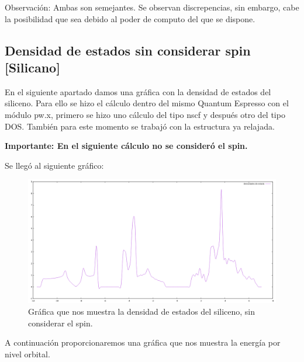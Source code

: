\vspace{0.2cm}

Observación: Ambas son semejantes. Se observan discrepencias,
sin embargo, cabe la posibilidad que sea debido al poder de computo del que se dispone.



\newpage

\subsection{Densidad de estados sin considerar spin [Silicano]}

En el siguiente apartado damos una gráfica con la densidad de estados del siliceno. Para 
ello se hizo el cálculo dentro del mismo Quantum Espresso con el módulo pw.x, primero se hizo uno cálculo 
del tipo nscf y después otro del tipo DOS. También para este momento se trabajó con la estructura
ya relajada.

\vspace{0.5cm}

\textbf{Importante: En el siguiente cálculo no se consideró el spin.}

\vspace{0.5cm}

Se llegó al siguiente gráfico:

\begin{figure}[H]
    \centering
    \includegraphics[scale=0.35]{images_silicano/Densidades_estado_sin_spin.png}
    \caption{Gráfica que nos muestra la densidad de estados del siliceno, sin considerar el spin.}
\end{figure}

A continuación proporcionaremos una gráfica que nos muestra la energía por nivel orbital.

